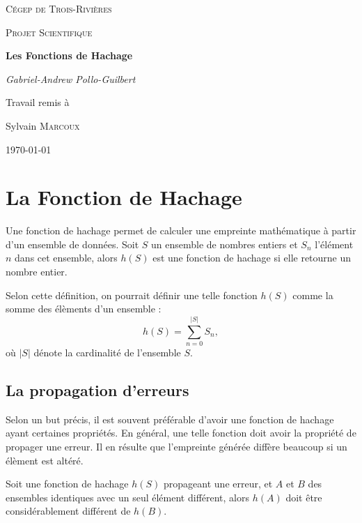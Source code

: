 \documentclass[11pt]{article}
\begin{document}
\begin{titlepage}
	\centering
	\par\vspace{1cm}
	{\scshape\LARGE Cégep de Trois-Rivières\par}
	\vspace{1cm}
	{\scshape\Large Projet Scientifique\par}
	\vspace{1.5cm}
	{\huge\bfseries Les Fonctions de Hachage\par}
	\vspace{2cm}
	{\Large\itshape Gabriel-Andrew Pollo-Guilbert\par}
	\vfill
	Travail remis à\par
	Sylvain \textsc{Marcoux}
	\vfill
	{\large\today\par}
\end{titlepage}

\section{La Fonction de Hachage}
Une fonction de hachage permet de calculer une empreinte mathématique à partir d'un ensemble de données. Soit $S$ un ensemble de nombres entiers et $S_{n}$ l'élément $n$ dans cet ensemble, alors $h(S)$ est une fonction de hachage si elle retourne un nombre entier.

Selon cette définition, on pourrait définir une telle fonction $h(S)$ comme la somme des élèments d'un ensemble :
\begin{equation}\label{simple}
h(S)=\displaystyle\sum_{n=0}^{|S|}S_{n},
\end{equation}
où $|S|$ dénote la cardinalité de l'ensemble $S$.

\subsection{La propagation d'erreurs}
Selon un but précis, il est souvent préférable d'avoir une fonction de hachage ayant certaines propriétés. En général, une telle fonction doit avoir la propriété de propager une erreur. Il en résulte que l'empreinte générée diffère beaucoup si un élèment est altéré.

Soit une fonction de hachage $h(S)$ propageant une erreur, et $A$ et $B$ des ensembles identiques avec un seul élément différent, alors $h(A)$ doit être considérablement différent de $h(B)$.
\end{document}
